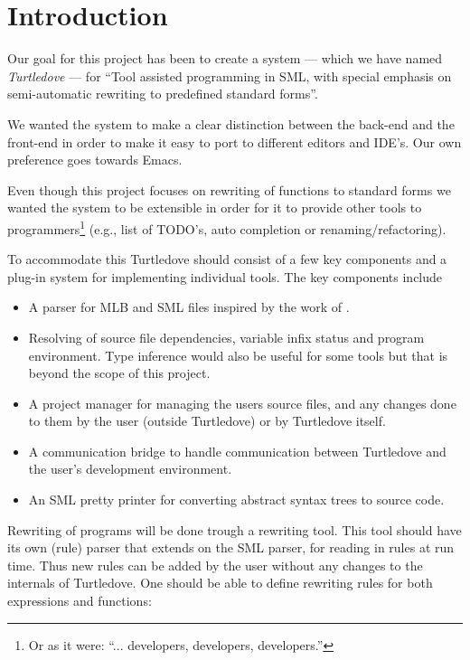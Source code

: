 \chapter{Introduction}\label{chap:introduction}
Our goal for this project has been to create a system --- which we have named
\textit{Turtledove} --- for ``Tool assisted programming in SML, with special
emphasis on semi-automatic rewriting to predefined standard forms''.

We wanted the system to make a clear distinction between the back-end and the
front-end in order to make it easy to port to different editors and IDE's. Our
own preference goes towards Emacs.

Even though this project focuses on rewriting of functions to standard forms we
wanted the system to be extensible in order for it to provide other tools to
programmers\footnote{Or as it were: ``... developers, developers, developers.''}
(e.g., list of TODO's, auto completion or renaming/refactoring).

To accommodate this Turtledove should consist of a few key components and a
plug-in system for implementing individual tools. The key components include
\begin{itemize}
\item A parser for MLB and SML files inspired by the work of \cite{mbp08}.
\item Resolving of source file dependencies, variable infix status and program
  environment. Type inference would also be useful for some tools but that is
  beyond the scope of this project.
\item A project manager for managing the users source files, and any changes
  done to them by the user (outside Turtledove) or by Turtledove itself.
\item A communication bridge to handle communication between Turtledove and the
  user's development environment.
\item An SML pretty printer for converting abstract syntax trees to source code.
\end{itemize}

Rewriting of programs will be done trough a rewriting tool. This tool should
have its own (rule) parser that extends on the SML parser, for reading in rules
at run time. Thus new rules can be added by the user without any changes to the
internals of Turtledove. One should be able to define rewriting rules for both
expressions and functions:

